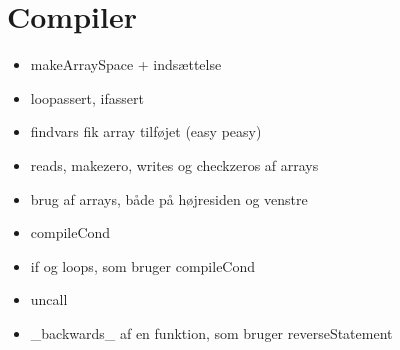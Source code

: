 \section{Compiler}
\begin{itemize}
\item makeArraySpace + indsættelse
\item loopassert, ifassert
\item findvars fik array tilføjet (easy peasy)
\item reads, makezero, writes og checkzeros af arrays
\item brug af arrays, både på højresiden og venstre
\item compileCond
\item if og loops, som bruger compileCond
\item uncall
\item \_backwards\_ af en funktion, som bruger reverseStatement
\end{itemize}

